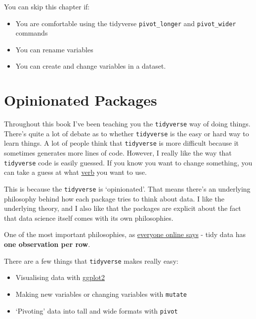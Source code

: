 \documentclass[
]{book}
\begin{document}
\begin{los}
You can skip this chapter if:

\begin{itemize}
\item
  You are comfortable using the tidyverse \texttt{pivot\_longer} and
  \texttt{pivot\_wider} commands
\item
  You can rename variables
\item
  You can create and change variables in a dataset.
\end{itemize}
\end{los}

\hypertarget{tidy_opinions}{%
\section{Opinionated Packages}\label{tidy_opinions}}

Throughout this book I've been teaching you the \texttt{tidyverse} way of doing things. There's quite a lot of debate as to whether \texttt{tidyverse} is the easy or hard way to learn things. A lot of people think that \texttt{tidyverse} is more difficult because it sometimes generates more lines of code. However, I really like the way that \texttt{tidyverse} code is easily guessed. If you know you want to change something, you can take a guess at what \href{https://dplyr.tidyverse.org/}{verb} you want to use.

This is because the \texttt{tidyverse} is `opinionated'. That means there's an underlying philosophy behind how each package tries to think about data. I like the underlying theory, and I also like that the packages are explicit about the fact that data science itself comes with its own philosophies.

One of the most important philosophies, as \href{http://vita.had.co.nz/papers/tidy-data.html}{everyone online says} - tidy data has \textbf{one observation per row}.

There are a few things that \texttt{tidyverse} makes really easy:

\begin{itemize}
\item
  Visualising data with \protect\hyperlink{gg_build}{ggplot2}
\item
  Making new variables or changing variables with \texttt{mutate}
\item
  `Pivoting' data into tall and wide formats with \texttt{pivot}
\end{itemize}
\end{document}
